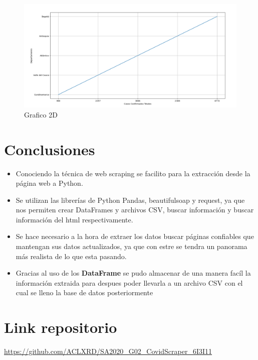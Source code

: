 \documentclass[conference,compsoc,onecolumn]{IEEEtran}
\begin{document}
\begin{figure}[H]
    \centering
    \includegraphics[keepaspectratio , scale = 0.3]{Grafica3.jpg}
    \caption{Grafico 2D}\label{Grafico2D}
    \label{sec:results}
\end{figure}

\section{Conclusiones}
\label{sec:conclusions}
\begin{itemize}
\item Conociendo la técnica de web scraping se facilito para la extracción desde la página web a Python.
\item Se utilizan las librerías de Python Pandas, beautifulsoap y request, ya que nos permiten crear DataFrames y archivos CSV, buscar información y buscar información del html respectivamente.
\item Se hace necesario a la hora de extraer los datos buscar páginas confiables que mantengan sus datos actualizados, ya que con estre se tendra un panorama más realista de lo que esta pasando.
\item Gracias al uso de los \textbf{DataFrame} se pudo almacenar de una manera facíl la información extraida para despues poder llevarla a un archivo CSV con el cual se lleno la base de datos posteriormente 

 \end{itemize}


\section{Link repositorio}
\label{sec:LinkRepositorio}
\url{https://github.com/ACLXRD/SA2020_G02_CovidScraper_6I3I11}


\nocite{*}

\label{sec:biblio}
 





\end{document}
